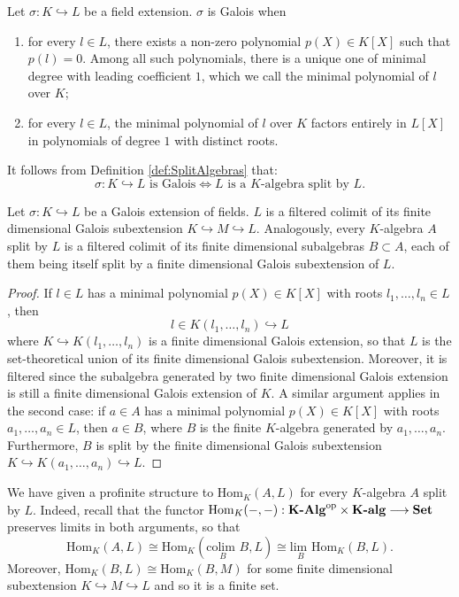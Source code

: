 \begin{definition}
     Let $\sigma:K\hookrightarrow L$ be a field extension. $\sigma$ is Galois when
    \begin{enumerate}
        \item for every $l\in L$, there exists a non-zero polynomial $p(X)\in K[X]$ such that $p(l)=0$. Among all such polynomials, there is a unique one of minimal degree with leading coefficient $1$, which we call the minimal polynomial of $l$ over $K$;
        \item for every $l\in L$, the minimal polynomial of $l$ over $K$ factors entirely in $L[X]$ in polynomials of degree $1$ with distinct roots.
    \end{enumerate}
\end{definition}
It follows from Definition \ref{def:SplitAlgebras} that:
\[ \sigma:K\hookrightarrow L\text{ is Galois}\iff L \text{ is a $K$-algebra split by } L. \]

\begin{lemma}
\label{lem:ColimitFinite}
    Let $\sigma:K\hookrightarrow L$ be a Galois extension of fields. $L$ is a filtered colimit of its finite dimensional Galois subextension $K\hookrightarrow M\hookrightarrow L$. Analogously, every $K$-algebra $A$ split by $L$ is a filtered colimit of its finite dimensional subalgebras $B\subset A$, each of them being itself split by a finite dimensional Galois subextension of $L$.
    \begin{proof}
        If $l\in L$ has a minimal polynomial $p(X)\in K[X]$ with roots $l_1,\dots,l_n\in L$, then
        \[ l\in K(l_1,\dots,l_n)\hookrightarrow L \]
        where $K\hookrightarrow K(l_1,\dots,l_n)$ is a finite dimensional Galois extension, so that $L$ is the set-theoretical union of its finite dimensional Galois subextension. Moreover, it is filtered since the subalgebra generated by two finite dimensional Galois extension is still a finite dimensional Galois extension of $K$. A similar argument applies in the second case: if $a\in A$ has a minimal polynomial $p(X)\in K[X]$ with roots $a_1,\dots,a_n\in L$, then $a\in B$, where $B$ is the finite $K$-algebra generated by $a_1,\dots,a_n$. Furthermore, $B$ is split by the finite dimensional Galois subextension $K\hookrightarrow K(a_1,\dots,a_n)\hookrightarrow L$.
    \end{proof}
\end{lemma}
\begin{oss*}
    We have given a profinite structure to $\text{Hom}_K(A,L)$ for every $K$-algebra $A$ split by $L$. Indeed, recall that the functor $\text{Hom}_K(-,-):{\textbf{K-Alg}}^{\mathrm{op}}\times\textbf{K-alg}\longrightarrow \textbf{Set}$ preserves limits in both arguments, so that
    \[ \text{Hom}_K(A,L)\cong \text{Hom}_K(\underset{B}{\text{colim }}B,L)\cong \underset{B}{\text{lim }}\text{Hom}_K(B,L).  \]
    Moreover, $\text{Hom}_K(B,L)\cong\text{Hom}_K(B,M)$ for some finite dimensional subextension $K\hookrightarrow M\hookrightarrow L$ and so it is a finite set.
\end{oss*}

